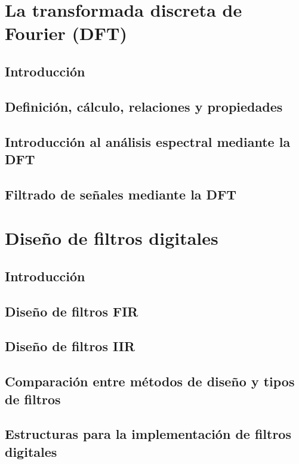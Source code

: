 \documentclass[a4paper]{book}
\begin{document}
\chapter{La transformada discreta de Fourier (DFT)}

\section{Introducción}

\section{Definición, cálculo, relaciones y propiedades}

\section{Introducción al análisis espectral mediante la DFT}

\section{Filtrado de señales mediante la DFT}


\chapter{Diseño de filtros digitales}

\section{Introducción}

\section{Diseño de filtros FIR}

\section{Diseño de filtros IIR}

\section{Comparación entre métodos de diseño y tipos de filtros}

\section{Estructuras para la implementación de filtros digitales}



%
\end{document}
